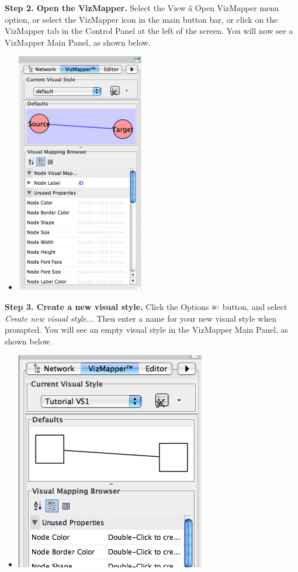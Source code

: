  \textbf{Step 2. Open the VizMapper.}
 Select the View \^a Open VizMapper menu option, or select the VizMapper icon in the main button bar, or click on the VizMapper tab in the Control Panel at the left of the screen. You will now see a VizMapper Main Panel, as shown below. 
\begin{itemize}
\item 

 \includegraphics[width=.4\textwidth]{images/NewVizMapper.png} 


\end{itemize}


 \textbf{Step 3. Create a new visual style.}
 Click the Options \includegraphics[width=1em]{images/VizMapOptionIcon.png}  button, and select \emph{Create new visual style...}
 Then enter a name for your new visual style when prompted. You will see an empty visual style in the VizMapper Main Panel, as shown below. 
\begin{itemize}
\item 

 \includegraphics[width=.6\textwidth]{images/EmptyVisualStyle.png} 


\end{itemize}


